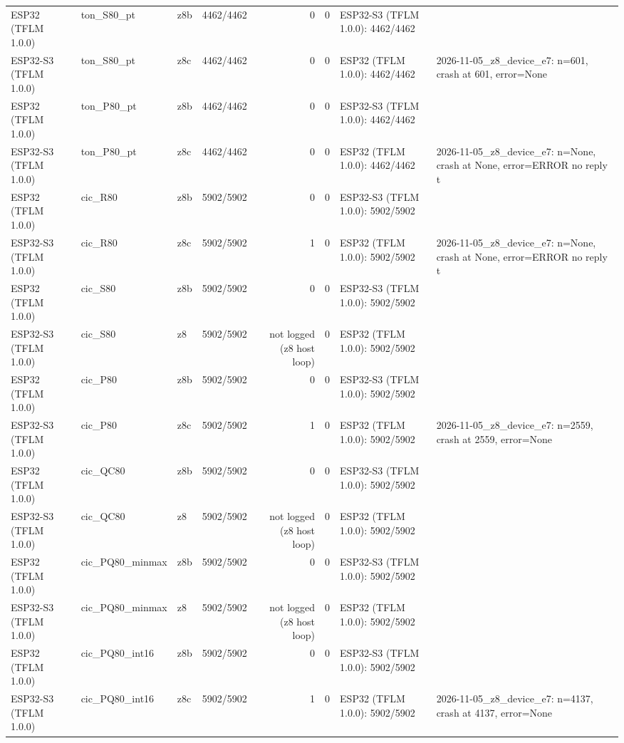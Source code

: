\documentclass[10pt]{article}
\begin{document}
{\begin{longtable}{lllrrrll}
ESP32 (TFLM 1.0.0) & ton\_S80\_pt & z8b & 4462/4462 & 0 & 0 & ESP32-S3 (TFLM 1.0.0): 4462/4462 &  \\
ESP32-S3 (TFLM 1.0.0) & ton\_S80\_pt & z8c & 4462/4462 & 0 & 0 & ESP32 (TFLM 1.0.0): 4462/4462 & 2026-11-05\_z8\_device\_e7: n=601, crash at 601, error=None \\
ESP32 (TFLM 1.0.0) & ton\_P80\_pt & z8b & 4462/4462 & 0 & 0 & ESP32-S3 (TFLM 1.0.0): 4462/4462 &  \\
ESP32-S3 (TFLM 1.0.0) & ton\_P80\_pt & z8c & 4462/4462 & 0 & 0 & ESP32 (TFLM 1.0.0): 4462/4462 & 2026-11-05\_z8\_device\_e7: n=None, crash at None, error=ERROR no reply t \\
ESP32 (TFLM 1.0.0) & cic\_R80 & z8b & 5902/5902 & 0 & 0 & ESP32-S3 (TFLM 1.0.0): 5902/5902 &  \\
ESP32-S3 (TFLM 1.0.0) & cic\_R80 & z8c & 5902/5902 & 1 & 0 & ESP32 (TFLM 1.0.0): 5902/5902 & 2026-11-05\_z8\_device\_e7: n=None, crash at None, error=ERROR no reply t \\
ESP32 (TFLM 1.0.0) & cic\_S80 & z8b & 5902/5902 & 0 & 0 & ESP32-S3 (TFLM 1.0.0): 5902/5902 &  \\
ESP32-S3 (TFLM 1.0.0) & cic\_S80 & z8 & 5902/5902 & not logged (z8 host loop) & 0 & ESP32 (TFLM 1.0.0): 5902/5902 &  \\
ESP32 (TFLM 1.0.0) & cic\_P80 & z8b & 5902/5902 & 0 & 0 & ESP32-S3 (TFLM 1.0.0): 5902/5902 &  \\
ESP32-S3 (TFLM 1.0.0) & cic\_P80 & z8c & 5902/5902 & 1 & 0 & ESP32 (TFLM 1.0.0): 5902/5902 & 2026-11-05\_z8\_device\_e7: n=2559, crash at 2559, error=None \\
ESP32 (TFLM 1.0.0) & cic\_QC80 & z8b & 5902/5902 & 0 & 0 & ESP32-S3 (TFLM 1.0.0): 5902/5902 &  \\
ESP32-S3 (TFLM 1.0.0) & cic\_QC80 & z8 & 5902/5902 & not logged (z8 host loop) & 0 & ESP32 (TFLM 1.0.0): 5902/5902 &  \\
ESP32 (TFLM 1.0.0) & cic\_PQ80\_minmax & z8b & 5902/5902 & 0 & 0 & ESP32-S3 (TFLM 1.0.0): 5902/5902 &  \\
ESP32-S3 (TFLM 1.0.0) & cic\_PQ80\_minmax & z8 & 5902/5902 & not logged (z8 host loop) & 0 & ESP32 (TFLM 1.0.0): 5902/5902 &  \\
ESP32 (TFLM 1.0.0) & cic\_PQ80\_int16 & z8b & 5902/5902 & 0 & 0 & ESP32-S3 (TFLM 1.0.0): 5902/5902 &  \\
ESP32-S3 (TFLM 1.0.0) & cic\_PQ80\_int16 & z8c & 5902/5902 & 1 & 0 & ESP32 (TFLM 1.0.0): 5902/5902 & 2026-11-05\_z8\_device\_e7: n=4137, crash at 4137, error=None \\
\end{longtable}}
\end{document}
